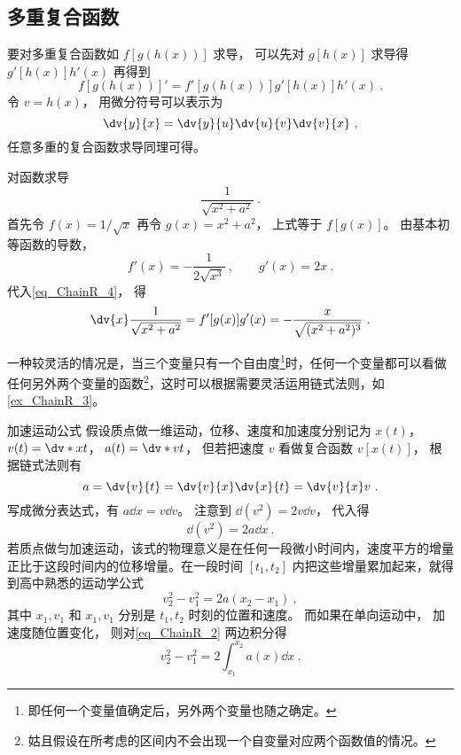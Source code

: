 \subsection{多重复合函数}
要对多重复合函数如 $f[g(h(x))]$ 求导， 可以先对 $g[h(x)]$ 求导得 $g'[h(x)]h'(x)$ 再得到
\begin{equation}
f[g(h(x))]' = f'[g(h(x))]g'[h(x)]h'(x)~.
\end{equation}
令 $v = h(x)$， 用微分符号可以表示为
\begin{equation}
\dv{y}{x} = \dv{y}{u}\dv{u}{v}\dv{v}{x}~,
\end{equation}
任意多重的复合函数求导同理可得。

\begin{example}{对函数求导}
\begin{equation}
\frac{1}{\sqrt{x^2+a^2}}~.
\end{equation}
首先令 $f(x) = 1/\sqrt{x}$ 再令 $g(x) = x^2+a^2$， 上式等于 $f[g(x)]$。 由基本初等函数的导数，
\begin{equation}
f'(x) = -\frac{1}{2\sqrt{x^3}} ~, \qquad g'(x) = 2x~.
\end{equation}
代入\autoref{eq_ChainR_4}， 得
\begin{equation}
\dv{x} \frac{1}{\sqrt{x^2+a^2}} =  f'[g(x)] g'(x) = -\frac{x}{\sqrt{(x^2+a^2)^3}}~.
\end{equation}
\end{example}

一种较灵活的情况是，当三个变量只有一个自由度\footnote{即任何一个变量值确定后，另外两个变量也随之确定。}时，任何一个变量都可以看做任何另外两个变量的函数\footnote{姑且假设在所考虑的区间内不会出现一个自变量对应两个函数值的情况。}，这时可以根据需要灵活运用链式法则，如\autoref{ex_ChainR_3}。

\begin{example}{加速运动公式}\label{ex_ChainR_3}
假设质点做一维运动，位移、速度和加速度分别记为 $x(t)$，  $v(t) = \dv*{x}{t}$，  $a(t) = \dv*{v}{t}$， 但若把速度 $v$ 看做复合函数 $v[x(t)]$， 根据链式法则有
\begin{equation}
a = \dv{v}{t} = \dv{v}{x}\dv{x}{t} = \dv{v}{x}v~.
\end{equation}
写成微分表达式，有 $a\dd{x} = v\dd{v}$。 注意到 $\dd (v^2) = 2v\dd{v}$， 代入得
\begin{equation}\label{eq_ChainR_2}
\dd(v^2) = 2a \dd{x}~.
\end{equation}
若质点做匀加速运动，该式的物理意义是在任何一段微小时间内，速度平方的增量正比于这段时间内的位移增量。在一段时间 $[t_1,t_2]$ 内把这些增量累加起来，就得到高中熟悉的运动学公式
\begin{equation}
v_2^2-v_1^2 = 2a(x_2-x_1)~,
\end{equation}
其中 $x_1,v_1$ 和 $x_1,v_1$ 分别是 $t_1,t_2$ 时刻的位置和速度。 而如果在单向运动中， 加速度随位置变化， 则对\autoref{eq_ChainR_2} 两边积分得
\begin{equation}
v_2^2 - v_1^2 = 2\int_{x_1}^{x_2}a(x)\dd{x}~.
\end{equation}
\end{example}
